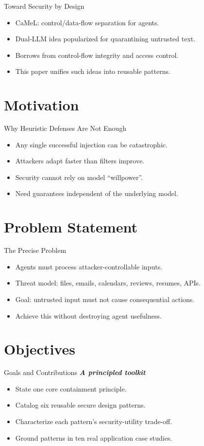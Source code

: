 \documentclass{beamer}
\begin{document}
\begin{frame}{Toward Security by Design}
\begin{itemize}
\item CaMeL: control/data-flow separation for agents.
\item Dual-LLM idea popularized for quarantining untrusted text.
\item Borrows from control-flow integrity and access control.
\item This paper unifies such ideas into reusable patterns.
\end{itemize}
\end{frame}

\section{Motivation}
\begin{frame}{Why Heuristic Defenses Are Not Enough}
\begin{itemize}
\item Any single successful injection can be catastrophic.
\item Attackers adapt faster than filters improve.
\item Security cannot rely on model ``willpower''.
\item Need guarantees independent of the underlying model.
\end{itemize}
\end{frame}

\section{Problem Statement}
\begin{frame}{The Precise Problem}
\begin{itemize}
\item Agents must process attacker-controllable inputs.
\item Threat model: files, emails, calendars, reviews, resumes, APIs.
\item Goal: untrusted input must not cause consequential actions.
\item Achieve this without destroying agent usefulness.
\end{itemize}
\end{frame}

\section{Objectives}
\begin{frame}{Goals and Contributions}
\textbf{\textit{A principled toolkit}}
\begin{itemize}
\item State one core containment principle.
\item Catalog six reusable secure design patterns.
\item Characterize each pattern's security-utility trade-off.
\item Ground patterns in ten real application case studies.
\end{itemize}
\end{frame}
\end{document}
